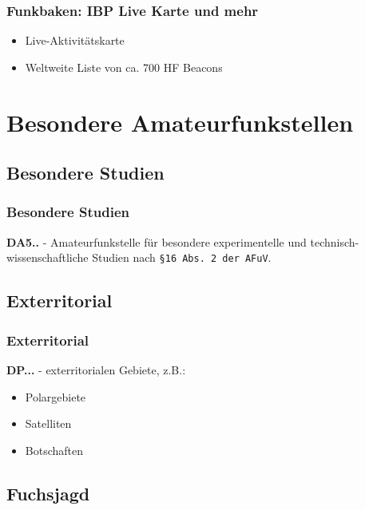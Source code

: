 \begin{frame}
    \frametitle{Funkbaken: IBP Live Karte und mehr}

    \begin{itemize}
        \item Live-Aktivitätskarte\hyperlink{refs}{\cite{bmap}}
        \item Weltweite Liste von ca. 700 HF Beacons\hyperlink{refs}{\cite{blist}}
    \end{itemize}

\end{frame}

\section{Besondere Amateurfunkstellen}

\subsection{Besondere Studien}

\begin{frame}
    \frametitle{Besondere Studien}

     \textbf{DA5..} - Amateurfunkstelle für besondere experimentelle und
     technisch-wissenschaftliche Studien nach \texttt{§16 Abs. 2 der AFuV}.

\end{frame}

\subsection{Exterritorial}

\begin{frame}
    \frametitle{Exterritorial}

    \textbf{DP...} - exterritorialen Gebiete, z.B.:
    
    \begin{itemize}
        \item Polargebiete
        \item Satelliten
        \item Botschaften
    \end{itemize}

\end{frame}

\subsection{Fuchsjagd}

